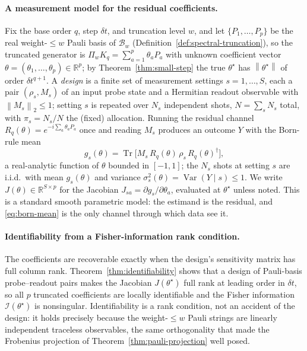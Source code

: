 \documentclass[aps,prresearch,reprint,superscriptaddress,nofootinbib,amsmath,amssymb]{revtex4-2}
\newcommand{\norm}[1]{\left\lVert #1 \right\rVert}
\newcommand{\Tr}{\operatorname{Tr}}
\newcommand{\cB}{\mathcal{B}}
\newcommand{\dt}{\delta t}
\begin{document}
\paragraph{A measurement model for the residual coefficients.} Fix the base order $q$, step $\dt$, and truncation level $w$, and let $\{P_1,\dots,P_p\}$ be the real weight-$\leq w$ Pauli basis of $\cB_w$ (Definition~\ref{def:spectral-truncation}), so the truncated generator is $\Pi_wK_q=\sum_{a=1}^{p}\theta_a P_a$ with unknown coefficient vector $\theta=(\theta_1,\dots,\theta_p)\in\mathbb{R}^{p}$; by Theorem~\ref{thm:small-step} the true $\theta^\star$ has $\norm{\theta^\star}$ of order $\dt^{q+1}$. A \emph{design} is a finite set of measurement settings $s=1,\dots,S$, each a pair $(\rho_s,M_s)$ of an input probe state and a Hermitian readout observable with $\norm{M_s}_2\le1$; setting $s$ is repeated over $N_s$ independent shots, $N=\sum_sN_s$ total, with $\pi_s=N_s/N$ the (fixed) allocation. Running the residual channel $R_q(\theta)=e^{-i\sum_a\theta_aP_a}$ once and reading $M_s$ produces an outcome $Y$ with the Born-rule mean
\begin{equation}
    g_s(\theta)=\Tr\!\bigl[M_s\,R_q(\theta)\,\rho_s\,R_q(\theta)^\dagger\bigr],
    \label{eq:born-mean}
\end{equation}
a real-analytic function of $\theta$ bounded in $[-1,1]$; the $N_s$ shots at setting $s$ are i.i.d.\ with mean $g_s(\theta)$ and variance $\sigma_s^2(\theta)=\operatorname{Var}(Y\mid s)\le1$. We write $J(\theta)\in\mathbb{R}^{S\times p}$ for the Jacobian $J_{sa}=\partial g_s/\partial\theta_a$, evaluated at $\theta^\star$ unless noted. This is a standard smooth parametric model: the estimand is the residual, and \eqref{eq:born-mean} is the only channel through which data see it.

\paragraph{Identifiability from a Fisher-information rank condition.} The coefficients are recoverable exactly when the design's sensitivity matrix has full column rank. Theorem~\ref{thm:identifiability} shows that a design of Pauli-basis probe--readout pairs makes the Jacobian $J(\theta^\star)$ full rank at leading order in $\dt$, so all $p$ truncated coefficients are locally identifiable and the Fisher information $\mathcal{I}(\theta^\star)$ is nonsingular. Identifiability is a rank condition, not an accident of the design: it holds precisely because the weight-$\leq w$ Pauli strings are linearly independent traceless observables, the same orthogonality that made the Frobenius projection of Theorem~\ref{thm:pauli-projection} well posed.
\end{document}
